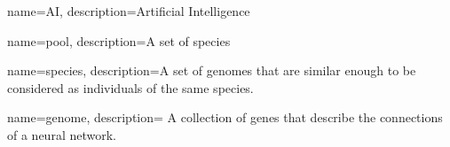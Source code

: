 
{
    name=AI,
    description={Artificial Intelligence}
}

{
    name=pool,
    description={A set of species}
}

{
    name=species,
    description={A set of genomes that are similar enough to be considered as individuals of the same species.}
}

{
    name=genome,
    description={ A collection of genes that describe the connections of a neural network. }
}

\glsaddall
\clearpage
\printglossary[title=Vocabulary, toctitle=Vocabulary]
